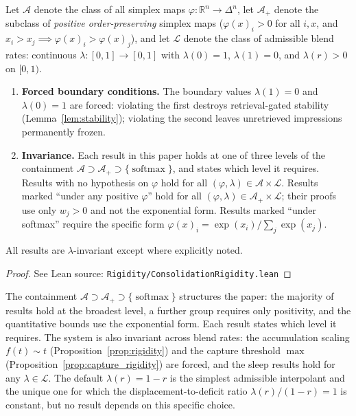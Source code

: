 \begin{proposition}
\label{prop:consolidation_rigidity}
\leanok
{}
Let $\mathcal{A}$ denote the class of all simplex maps $\varphi\colon \mathbb{R}^n \to \Delta^n$, let $\mathcal{A}_+$ denote the subclass of \emph{positive order-preserving} simplex maps ($\varphi(x)_i > 0$ for all $i,x$, and $x_i > x_j \implies \varphi(x)_i > \varphi(x)_j$), and let $\mathcal{L}$ denote the class of admissible blend rates: continuous $\lambda\colon [0,1] \to [0,1]$ with $\lambda(0) = 1$, $\lambda(1) = 0$, and $\lambda(r) > 0$ on $[0,1)$.
\begin{enumerate}
\item \textbf{Forced boundary conditions.} The boundary values $\lambda(1) = 0$ and $\lambda(0) = 1$ are forced: violating the first destroys retrieval-gated stability (Lemma~\ref{lem:stability}); violating the second leaves unretrieved impressions permanently frozen.
\item \textbf{Invariance.} Each result in this paper holds at one of three levels of the containment $\mathcal{A} \supset \mathcal{A}_+ \supset \{\operatorname{softmax}\}$, and states which level it requires.  Results with no hypothesis on $\varphi$ hold for all $(\varphi, \lambda) \in \mathcal{A} \times \mathcal{L}$.  Results marked ``under any positive $\varphi$'' hold for all $(\varphi, \lambda) \in \mathcal{A}_+ \times \mathcal{L}$; their proofs use only $w_j > 0$ and not the exponential form.  Results marked ``under softmax'' require the specific form $\varphi(x)_i = \exp(x_i)/\sum_j \exp(x_j)$.
\end{enumerate}
All results are $\lambda$-invariant except where explicitly noted.
\end{proposition}

\begin{proof}
\leanok
{}
See Lean source: \texttt{Rigidity/ConsolidationRigidity.lean}
\end{proof}

\begin{remark}
\label{rem:invariance}
\leanok
{}
The containment $\mathcal{A} \supset \mathcal{A}_+ \supset \{\operatorname{softmax}\}$ structures the paper: the majority of results hold at the broadest level, a further group requires only positivity, and the quantitative bounds use the exponential form.  Each result states which level it requires.  The system is also invariant across blend rates: the accumulation scaling $f(t) \sim t$ (Proposition~\ref{prop:rigidity}) and the capture threshold $\max$ (Proposition~\ref{prop:capture_rigidity}) are forced, and the sleep results hold for any $\lambda \in \mathcal{L}$.  The default $\lambda(r) = 1 - r$ is the simplest admissible interpolant and the unique one for which the displacement-to-deficit ratio $\lambda(r)/(1-r) = 1$ is constant, but no result depends on this specific choice.
\end{remark}

